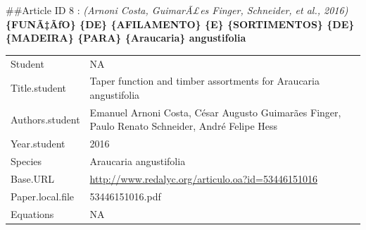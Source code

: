 \documentclass[]{article}
\begin{document}
\#\#Article ID 8 : \emph{(Arnoni Costa, GuimarÃ£es Finger, Schneider, et
al., 2016)} \textbf{\{FUNÃ‡ÃƒO\} \{DE\} \{AFILAMENTO\} \{E\}
\{SORTIMENTOS\} \{DE\} \{MADEIRA\} \{PARA\} \{Araucaria\} angustifolia}

\begin{longtable}[]{@{}ll@{}}
\toprule
\endhead
\begin{minipage}[t]{0.21\columnwidth}\raggedright
Student\strut
\end{minipage} & \begin{minipage}[t]{0.73\columnwidth}\raggedright
NA\strut
\end{minipage}\tabularnewline
\begin{minipage}[t]{0.21\columnwidth}\raggedright
Title.student\strut
\end{minipage} & \begin{minipage}[t]{0.73\columnwidth}\raggedright
Taper function and timber assortments for Araucaria angustifolia\strut
\end{minipage}\tabularnewline
\begin{minipage}[t]{0.21\columnwidth}\raggedright
Authors.student\strut
\end{minipage} & \begin{minipage}[t]{0.73\columnwidth}\raggedright
Emanuel Arnoni Costa, César Augusto Guimarães Finger, Paulo Renato
Schneider, André Felipe Hess\strut
\end{minipage}\tabularnewline
\begin{minipage}[t]{0.21\columnwidth}\raggedright
Year.student\strut
\end{minipage} & \begin{minipage}[t]{0.73\columnwidth}\raggedright
2016\strut
\end{minipage}\tabularnewline
\begin{minipage}[t]{0.21\columnwidth}\raggedright
Species\strut
\end{minipage} & \begin{minipage}[t]{0.73\columnwidth}\raggedright
Araucaria angustifolia\strut
\end{minipage}\tabularnewline
\begin{minipage}[t]{0.21\columnwidth}\raggedright
Base.URL\strut
\end{minipage} & \begin{minipage}[t]{0.73\columnwidth}\raggedright
\url{http://www.redalyc.org/articulo.oa?id=53446151016}\strut
\end{minipage}\tabularnewline
\begin{minipage}[t]{0.21\columnwidth}\raggedright
Paper.local.file\strut
\end{minipage} & \begin{minipage}[t]{0.73\columnwidth}\raggedright
53446151016.pdf\strut
\end{minipage}\tabularnewline
\begin{minipage}[t]{0.21\columnwidth}\raggedright
Equations\strut
\end{minipage} & \begin{minipage}[t]{0.73\columnwidth}\raggedright
NA\strut
\end{minipage}\tabularnewline
\bottomrule
\end{longtable}
\end{document}
